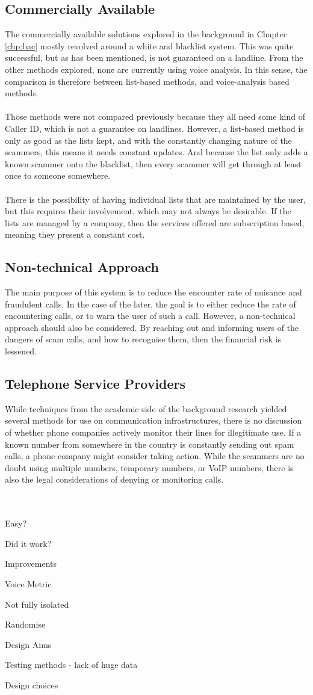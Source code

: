 \documentclass[main.tex]{subfiles}
\begin{document}
\subsection{Commercially Available}
The commercially available solutions explored in the background in Chapter \ref{chp:bac} mostly revolved around a white and blacklist system. This was quite successful, but as has been mentioned, is not guaranteed on a landline. From the other methods explored, none are currently using voice analysis. In this sense, the comparison is therefore between list-based methods, and voice-analysis based methods.
\\\\
Those methods were not compared previously because they all need some kind of Caller ID, which is not a guarantee on landlines. However, a list-based method is only as good as the lists kept, and with the constantly changing nature of the scammers, this means it needs constant updates. And because the list only adds a known scammer onto the blacklist, then every scammer will get through at least once to someone somewhere.
\\\\
There is the possibility of having individual lists that are maintained by the user, but this requires their involvement, which may not always be desirable. If the lists are managed by a company, then the services offered are subscription based, meaning they present a constant cost.

\subsection{Non-technical Approach}
The main purpose of this system is to reduce the encounter rate of nuisance and fraudulent calls. In the case of the later, the goal is to either reduce the rate of encountering calls, or to warn the user of such a call. However, a non-technical approach should also be considered. By reaching out and informing users of the dangers of scam calls, and how to recognise them, then the financial risk is lessened.

\subsection{Telephone Service Providers}
While techniques from the academic side of the background research yielded several methods for use on communication infrastructures, there is no discussion of whether phone companies actively monitor their lines for illegitimate use. If a known number from somewhere in the country is constantly sending out spam calls, a phone company might consider taking action. While the scammers are no doubt using multiple numbers, temporary numbers, or VoIP numbers, there is also the legal considerations of denying or monitoring calls.

\hrulefill
\\\\

Easy?

Did it work?

Improvements

Voice Metric

Not fully isolated

Randomise

Design Aims

Testing methods - lack of huge data

Design choices
\end{document}
